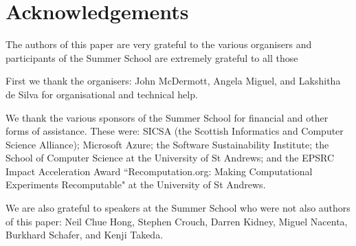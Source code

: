 \section*{Acknowledgements}
\label{s:ack}

The authors of this paper are very grateful to 
the various organisers and participants of the Summer School are extremely grateful to all those 

First we thank the organisers: John McDermott, Angela Miguel, and Lakshitha de Silva for organisational and technical help.

We thank the various sponsors of the Summer School  for financial and other forms of assistance.
These were: SICSA (the Scottish Informatics and Computer Science Alliance); 
Microsoft Azure; the Software Sustainability Institute; 
the School of Computer Science at the University of St Andrews; 
and the EPSRC Impact Acceleration Award ``Recomputation.org: Making Computational Experiments Recomputable"
at the University of St Andrews.

We are also grateful to speakers at the Summer School who were not also authors of this paper: 
Neil Chue Hong,
Stephen Crouch, 
Darren Kidney, 
Miguel Nacenta,
Burkhard Schafer, and
Kenji Takeda.


